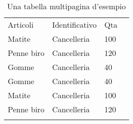 \usepackage{longtable}
\begin{center}
\begin{longtable}{llll} %
Articoli      & Identificativo & Qta \\
Matite        & Cancelleria    & 100      \\
Penne biro    & Cancelleria    & 120      \\
Gomme         & Cancelleria    & 40       \\
Gomme         & Cancelleria    & 40       \\
Matite        & Cancelleria    & 100      \\
Penne biro    & Cancelleria    & 120      \\
\caption{Una tabella multipagina d'esempio}
\end{longtable}
\end{center}